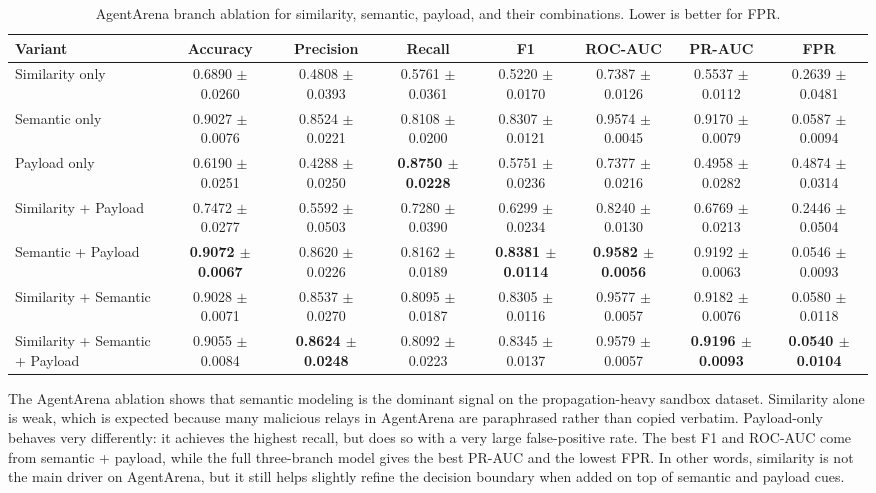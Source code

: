 \begin{table}[t]
\centering
\small
\setlength{\tabcolsep}{4pt}
\caption{AgentArena branch ablation for similarity, semantic, payload,
and their combinations. Lower is better for FPR.}
\label{tab:tuned-agentarena-ablation}
\begin{tabular}{lccccccc}
\toprule
Variant & Accuracy & Precision & Recall & F1 & ROC-AUC & PR-AUC & FPR \\
\midrule
Similarity only
& 0.6890 $\pm$ 0.0260
& 0.4808 $\pm$ 0.0393
& 0.5761 $\pm$ 0.0361
& 0.5220 $\pm$ 0.0170
& 0.7387 $\pm$ 0.0126
& 0.5537 $\pm$ 0.0112
& 0.2639 $\pm$ 0.0481 \\
Semantic only
& 0.9027 $\pm$ 0.0076
& 0.8524 $\pm$ 0.0221
& 0.8108 $\pm$ 0.0200
& 0.8307 $\pm$ 0.0121
& 0.9574 $\pm$ 0.0045
& 0.9170 $\pm$ 0.0079
& 0.0587 $\pm$ 0.0094 \\
Payload only
& 0.6190 $\pm$ 0.0251
& 0.4288 $\pm$ 0.0250
& \textbf{0.8750 $\pm$ 0.0228}
& 0.5751 $\pm$ 0.0236
& 0.7377 $\pm$ 0.0216
& 0.4958 $\pm$ 0.0282
& 0.4874 $\pm$ 0.0314 \\
Similarity + Payload
& 0.7472 $\pm$ 0.0277
& 0.5592 $\pm$ 0.0503
& 0.7280 $\pm$ 0.0390
& 0.6299 $\pm$ 0.0234
& 0.8240 $\pm$ 0.0130
& 0.6769 $\pm$ 0.0213
& 0.2446 $\pm$ 0.0504 \\
Semantic + Payload
& \textbf{0.9072 $\pm$ 0.0067}
& 0.8620 $\pm$ 0.0226
& 0.8162 $\pm$ 0.0189
& \textbf{0.8381 $\pm$ 0.0114}
& \textbf{0.9582 $\pm$ 0.0056}
& 0.9192 $\pm$ 0.0063
& 0.0546 $\pm$ 0.0093 \\
Similarity + Semantic
& 0.9028 $\pm$ 0.0071
& 0.8537 $\pm$ 0.0270
& 0.8095 $\pm$ 0.0187
& 0.8305 $\pm$ 0.0116
& 0.9577 $\pm$ 0.0057
& 0.9182 $\pm$ 0.0076
& 0.0580 $\pm$ 0.0118 \\
Similarity + Semantic + Payload
& 0.9055 $\pm$ 0.0084
& \textbf{0.8624 $\pm$ 0.0248}
& 0.8092 $\pm$ 0.0223
& 0.8345 $\pm$ 0.0137
& 0.9579 $\pm$ 0.0057
& \textbf{0.9196 $\pm$ 0.0093}
& \textbf{0.0540 $\pm$ 0.0104} \\
\bottomrule
\end{tabular}
\end{table}

The AgentArena ablation shows that semantic modeling is the dominant
signal on the propagation-heavy sandbox dataset. Similarity alone is
weak, which is expected because many malicious relays in AgentArena are
paraphrased rather than copied verbatim. Payload-only behaves very
differently: it achieves the highest recall, but does so with a very
large false-positive rate. The best F1 and ROC-AUC come from
semantic + payload, while the full three-branch model gives the
best PR-AUC and the lowest FPR. In other words, similarity is not
the main driver on AgentArena, but it still helps slightly refine the
decision boundary when added on top of semantic and payload cues.

